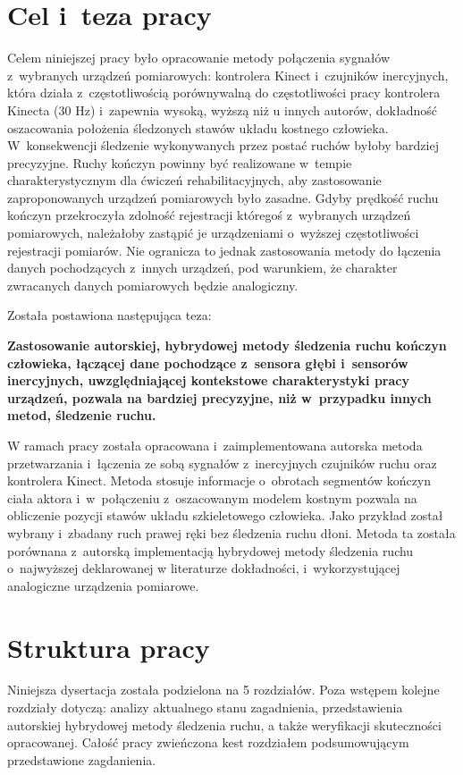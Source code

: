 \section{Cel i~teza pracy}
Celem niniejszej pracy było opracowanie metody połączenia sygnałów z~wybranych urządzeń pomiarowych: kontrolera Kinect i~czujników inercyjnych, która działa z~częstotliwością porównywalną do częstotliwości pracy kontrolera Kinecta (30 Hz) i~zapewnia wysoką, wyższą niż u innych autorów, dokładność oszacowania położenia śledzonych stawów układu kostnego człowieka. W~konsekwencji śledzenie wykonywanych przez postać ruchów byłoby bardziej precyzyjne. Ruchy kończyn powinny być realizowane w~tempie charakterystycznym dla ćwiczeń rehabilitacyjnych, aby zastosowanie zaproponowanych urządzeń pomiarowych było zasadne. Gdyby prędkość ruchu kończyn przekroczyła zdolność rejestracji któregoś z~wybranych urządzeń pomiarowych, należałoby zastąpić je urządzeniami o~wyższej częstotliwości rejestracji pomiarów. Nie ogranicza to jednak zastosowania metody do łączenia danych pochodzących z~innych urządzeń, pod warunkiem, że charakter zwracanych danych pomiarowych będzie analogiczny. 

Została postawiona następująca teza:\\
\begin{center}
	\textbf{Zastosowanie autorskiej, hybrydowej metody śledzenia ruchu kończyn człowieka, łączącej dane pochodzące z~sensora głębi i~sensorów inercyjnych, uwzględniającej kontekstowe charakterystyki pracy urządzeń, pozwala na bardziej precyzyjne, niż w~przypadku innych metod, śledzenie ruchu.}
\end{center}

W ramach pracy została opracowana i~zaimplementowana autorska metoda przetwarzania i~łączenia ze sobą sygnałów z~inercyjnych czujników ruchu oraz kontrolera Kinect. Metoda stosuje informacje o~obrotach segmentów kończyn ciała aktora i~w~połączeniu z~oszacowanym modelem kostnym pozwala na obliczenie pozycji stawów układu szkieletowego człowieka. 
Jako przykład został wybrany i~zbadany ruch prawej ręki bez śledzenia ruchu dłoni. Metoda ta została porównana z~autorską implementacją hybrydowej metody śledzenia ruchu o~najwyższej deklarowanej w literaturze dokładności, i~wykorzystującej analogiczne urządzenia pomiarowe.\\

\section{Struktura pracy}
Niniejsza dysertacja została podzielona na 5 rozdziałów. Poza wstępem kolejne rozdziały dotyczą: analizy aktualnego stanu zagadnienia, przedstawienia autorskiej hybrydowej metody śledzenia ruchu, a także weryfikacji skuteczności opracowanej. Całość pracy zwieńczona kest rozdziałem podsumowującym przedstawione zagdanienia. 

